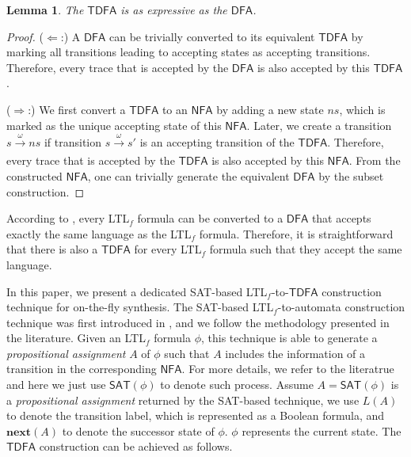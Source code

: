 \documentclass[letterpaper]{article} %
\newcommand{\ltlf}{\textsf{LTL}$_f$\xspace}
\newtheorem{lemma}{Lemma}
\newcommand{\tran}[1]{\xrightarrow[]{#1}}
\def\dfa{$\mathsf{DFA}$\xspace}
\def\NFA{$\mathsf{NFA}$\xspace}
\def\nfa{$\mathsf{NFA}$\xspace}
\def\tdfa{$\mathsf{TDFA}$\xspace}
\def\SAT{\textsf{SAT}\xspace}
\begin{document}
\begin{lemma}\label{lem:tdfa}
The \tdfa is as expressive as the \dfa.
\end{lemma}
\begin{proof}
	($\Leftarrow$:) A \dfa can be trivially converted to its equivalent \tdfa by marking all transitions leading to accepting states as accepting transitions. Therefore, every trace that is accepted by the \dfa is also accepted by this \tdfa.
	
	($\Rightarrow$:) We first convert a \tdfa to an \nfa by adding a new state $ns$, which is marked as the unique accepting state of this \nfa. Later, we create a transition $s\tran{\omega}ns$ if transition $s\tran{\omega}s'$ is an accepting transition of the \tdfa. Therefore, every trace that is accepted by the \tdfa is also accepted by this \nfa. From the constructed \nfa, one can trivially generate the equivalent \dfa by the subset construction. 
\end{proof}


According to \cite{GV13}, every \ltlf formula can be converted to a \dfa that accepts exactly the same language as the \ltlf formula. Therefore, it is straightforward that there is also a \tdfa for every \ltlf formula such that they accept the same language. 

In this paper, we present a dedicated \SAT-based \ltlf-to-\tdfa construction technique for on-the-fly synthesis. The \SAT-based \ltlf-to-automata construction technique was first introduced in \cite{LRPZV19}, and we follow the methodology presented in the literature. Given an \ltlf formula $\phi$, this technique is able to generate a \emph{propositional assignment} $A$ of $\phi$ such that $A$ includes the information of a transition in the corresponding \NFA. For more details,
we refer to the literatrue \cite{LRPZV19} and here we just use $\SAT(\phi)$ to denote such process. Assume $A = \SAT(\phi)$ is a \emph{propositional assignment} returned by the \SAT-based technique, we use $L(A)$ to denote the transition label, which is represented as a Boolean formula, and $\mathbf{next}(A)$ to denote the successor state of $\phi$. $\phi$ represents the current state.
The \tdfa construction can be achieved as follows.  
\end{document}
